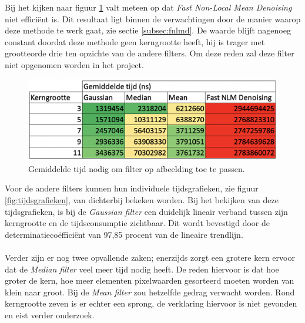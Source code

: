 Bij het kijken naar figuur \ref{fig:tijd} valt meteen op dat \textit{Fast Non-Local Mean Denoising} niet efficiënt is. Dit resultaat ligt binnen de verwachtingen door de manier waarop deze methode te werk gaat, zie sectie \ref{subsec:fnlmd}. De waarde blijft nagenoeg constant doordat deze methode geen kerngrootte heeft, hij is trager met grootteorde drie ten opzichte van de andere filters. Om deze reden zal deze filter niet opgenomen worden in het project. 

\begin{figure}[h!]
    \centering
    \includegraphics[width=\linewidth]{img/tijdsconsumptie}
    \caption{Gemiddelde tijd nodig om filter op afbeelding toe te passen.}
    \label{fig:tijd}
\end{figure}

Voor de andere filters kunnen hun individuele tijdsgrafieken, zie figuur \ref{fig:tijdsgrafieken}, van dichterbij bekeken worden. 
Bij het bekijken van deze tijdsgrafieken, is bij de \textit{Gaussian filter} een duidelijk lineair verband tussen zijn kerngrootte en de tijdsconsumptie zichtbaar. Dit wordt bevestigd door de determinatiecoëfficiënt van 97,85 procent van de lineaire trendlijn. 

\paragraph{}
Verder zijn er nog twee opvallende zaken; enerzijds zorgt een grotere kern ervoor dat de \textit{Median filter} veel meer tijd nodig heeft. De reden hiervoor is dat hoe groter de kern, hoe meer elementen pixelwaarden gesorteerd moeten worden van klein naar groot. Bij de {\it Mean filter} zou hetzelfde gedrag verwacht worden. Rond kerngrootte zeven is er echter een sprong, de verklaring hiervoor is niet gevonden en eist verder onderzoek.

